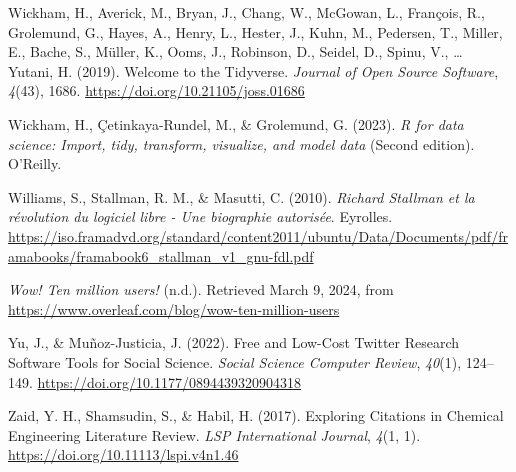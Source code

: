 \documentclass[
  letterpaper,
  DIV=11,
  numbers=noendperiod]{scrreprt}
\newlength{\cslhangindent}
\newenvironment{CSLReferences}[2] %
 {\begin{list}{}{%
  \setlength{\itemindent}{0pt}
  \setlength{\leftmargin}{0pt}
  \setlength{\parsep}{0pt}
  \ifodd #1
   \setlength{\leftmargin}{\cslhangindent}
   \setlength{\itemindent}{-1\cslhangindent}
  \fi
  \setlength{\itemsep}{#2\baselineskip}}}
 {\end{list}}
\begin{document}
\begin{CSLReferences}{1}{0}
Wickham, H., Averick, M., Bryan, J., Chang, W., McGowan, L., François,
R., Grolemund, G., Hayes, A., Henry, L., Hester, J., Kuhn, M., Pedersen,
T., Miller, E., Bache, S., Müller, K., Ooms, J., Robinson, D., Seidel,
D., Spinu, V., \ldots{} Yutani, H. (2019). Welcome to the {Tidyverse}.
\emph{Journal of Open Source Software}, \emph{4}(43), 1686.
\url{https://doi.org/10.21105/joss.01686}

Wickham, H., Çetinkaya-Rundel, M., \& Grolemund, G. (2023). \emph{R for
data science: Import, tidy, transform, visualize, and model data}
(Second edition). O'Reilly.

Williams, S., Stallman, R. M., \& Masutti, C. (2010). \emph{Richard
Stallman et la révolution du logiciel libre - Une biographie autorisée}.
Eyrolles.
\url{https://iso.framadvd.org/standard/content2011/ubuntu/Data/Documents/pdf/framabooks/framabook6_stallman_v1_gnu-fdl.pdf}

\emph{Wow! {Ten} million users!} (n.d.). Retrieved March 9, 2024, from
\url{https://www.overleaf.com/blog/wow-ten-million-users}

Yu, J., \& Muñoz-Justicia, J. (2022). Free and {Low-Cost Twitter
Research Software Tools} for {Social Science}. \emph{Social Science
Computer Review}, \emph{40}(1), 124--149.
\url{https://doi.org/10.1177/0894439320904318}

Zaid, Y. H., Shamsudin, S., \& Habil, H. (2017). Exploring {Citations}
in {Chemical Engineering Literature Review}. \emph{LSP International
Journal}, \emph{4}(1, 1). \url{https://doi.org/10.11113/lspi.v4n1.46}

\end{CSLReferences}
\end{document}
